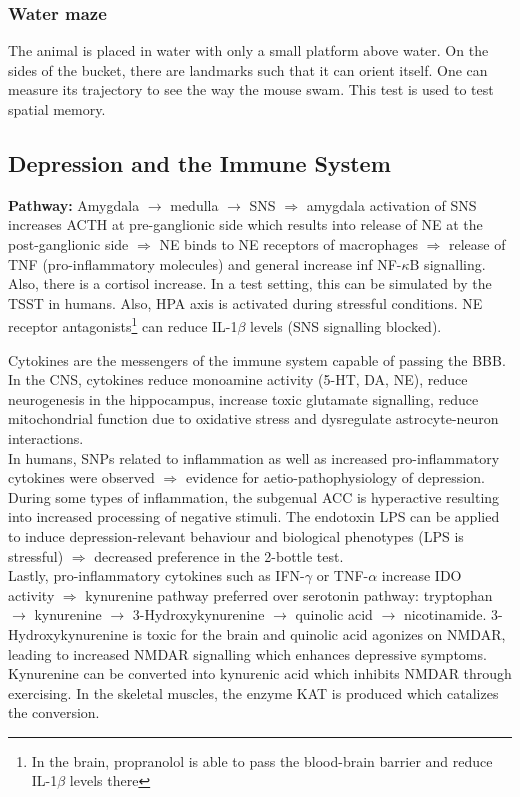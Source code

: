 \documentclass[twosided, a4paper, pt11]{article}
\begin{document}
	\subsubsection{Water maze}
	The animal is placed in water with only a small platform above water. On the sides of the bucket, there are landmarks such that it can orient itself. One can measure its trajectory to see the way the mouse swam. This test is used to test spatial memory.
	
	
	\subsection{Depression and the Immune System}
	\textbf{Pathway:} Amygdala $\rightarrow$ medulla $\rightarrow$ SNS $\Rightarrow$ amygdala activation of SNS increases ACTH at pre-ganglionic side which results into release of NE at the post-ganglionic side $\Rightarrow$ NE binds to NE receptors of macrophages $\Rightarrow$ release of TNF (pro-inflammatory molecules) and general increase inf NF-$\kappa$B signalling. Also, there is a cortisol increase. In a test setting, this can be simulated by the TSST in humans. Also, HPA axis is activated during stressful conditions. NE receptor antagonists\footnote{In the brain, propranolol is able to pass the blood-brain barrier and reduce IL-1$\beta$ levels there} can reduce IL-1$\beta$ levels (SNS signalling blocked).\newline
	
	Cytokines are the messengers of the immune system capable of passing the BBB. In the CNS, cytokines reduce monoamine activity (5-HT, DA, NE), reduce neurogenesis in the hippocampus, increase toxic glutamate signalling, reduce mitochondrial function due to oxidative stress and dysregulate astrocyte-neuron interactions.\\
	In humans, SNPs related to inflammation as well as increased pro-inflammatory cytokines were observed $\Rightarrow$ evidence for aetio-pathophysiology of depression. During some types of inflammation, the subgenual ACC is hyperactive resulting into increased processing of negative stimuli. The endotoxin LPS can be applied to induce depression-relevant behaviour and biological phenotypes (LPS is stressful) $\Rightarrow$ decreased preference in the 2-bottle test.\\
	Lastly, pro-inflammatory cytokines such as IFN-$\gamma$ or TNF-$\alpha$ increase IDO activity $\Rightarrow$ kynurenine pathway preferred over serotonin pathway: tryptophan $\rightarrow$ kynurenine $\rightarrow$ 3-Hydroxykynurenine $\rightarrow$ quinolic acid $\rightarrow$ nicotinamide. 3-Hydroxykynurenine is toxic for the brain and quinolic acid agonizes on NMDAR, leading to increased NMDAR signalling which enhances depressive symptoms. Kynurenine can be converted into kynurenic acid which inhibits NMDAR through exercising. In the skeletal muscles, the enzyme KAT is produced which catalizes the conversion.
	
\end{document}
